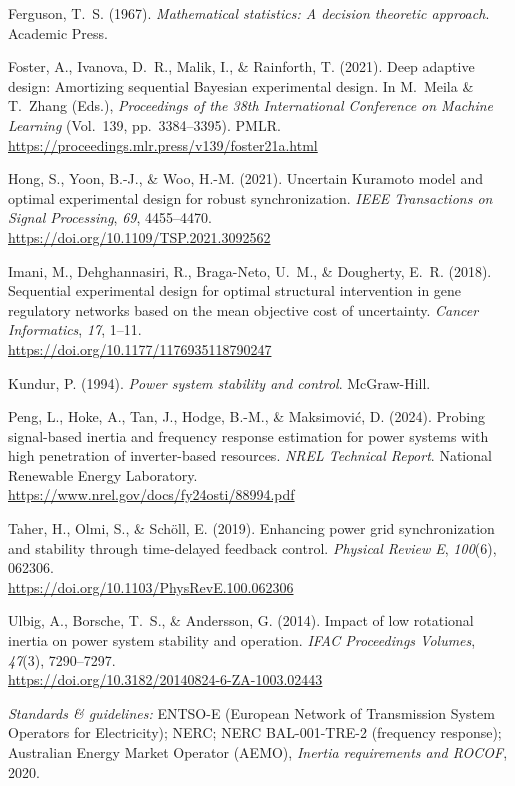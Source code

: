 \documentclass[10pt]{article}
\begin{document}
Ferguson, T.~S. (1967). \emph{Mathematical statistics: A decision theoretic approach}. Academic Press.

Foster, A., Ivanova, D.~R., Malik, I., \& Rainforth, T. (2021). Deep adaptive design: Amortizing sequential Bayesian experimental design. In M.~Meila \& T.~Zhang (Eds.), \emph{Proceedings of the 38th International Conference on Machine Learning} (Vol.~139, pp.~3384--3395). PMLR.\\
\url{https://proceedings.mlr.press/v139/foster21a.html}

Hong, S., Yoon, B.-J., \& Woo, H.-M. (2021). Uncertain Kuramoto model and optimal experimental design for robust synchronization. \emph{IEEE Transactions on Signal Processing}, \emph{69}, 4455--4470.\\
\url{https://doi.org/10.1109/TSP.2021.3092562}

Imani, M., Dehghannasiri, R., Braga-Neto, U.~M., \& Dougherty, E.~R. (2018). Sequential experimental design for optimal structural intervention in gene regulatory networks based on the mean objective cost of uncertainty. \emph{Cancer Informatics}, \emph{17}, 1--11.\\
\url{https://doi.org/10.1177/1176935118790247}

Kundur, P. (1994). \emph{Power system stability and control}. McGraw-Hill.

Peng, L., Hoke, A., Tan, J., Hodge, B.-M., \& Maksimovi\'c, D. (2024). Probing signal-based inertia and frequency response estimation for power systems with high penetration of inverter-based resources. \emph{NREL Technical Report}. National Renewable Energy Laboratory.\\
\url{https://www.nrel.gov/docs/fy24osti/88994.pdf}

Taher, H., Olmi, S., \& Schöll, E. (2019). Enhancing power grid synchronization and stability through time-delayed feedback control. \emph{Physical Review E}, \emph{100}(6), 062306.\\
\url{https://doi.org/10.1103/PhysRevE.100.062306}

Ulbig, A., Borsche, T.~S., \& Andersson, G. (2014). Impact of low rotational inertia on power system stability and operation. \emph{IFAC Proceedings Volumes}, \emph{47}(3), 7290--7297.\\
\url{https://doi.org/10.3182/20140824-6-ZA-1003.02443}

\medskip
\textit{Standards \& guidelines:} ENTSO-E (European Network of Transmission System Operators for Electricity); NERC; NERC BAL-001-TRE-2 (frequency response); Australian Energy Market Operator (AEMO), \emph{Inertia requirements and ROCOF}, 2020.

\endgroup
\end{document}
